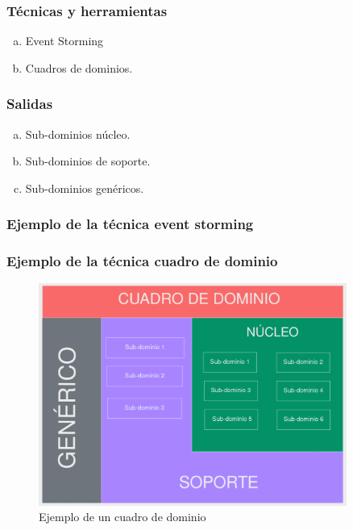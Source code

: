 \subsubsection*{Técnicas y herramientas}
\begin{enumerate}[a.]
	\item Event Storming
	\item Cuadros de dominios.
\end{enumerate}

\subsubsection*{Salidas}
\begin{enumerate}[a.]
    \item Sub-dominios núcleo.
    \item Sub-dominios de soporte.
    \item Sub-dominios genéricos.
\end{enumerate}

\subsubsection*{Ejemplo de la técnica event storming}


\subsubsection*{Ejemplo de la técnica cuadro de dominio}
\vspace{1em}

  \begin{figure}[htb]
    \caption{Ejemplo de un cuadro de dominio}
    \centering
    \includegraphics[width=0.90\textwidth]{src/assets/metodologia/cuadro_dominio}
  \end{figure}


